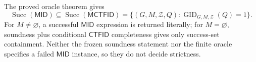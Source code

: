The proved oracle theorem gives
\[
 \operatorname{Succ}(\mathsf{MID})\subseteq\operatorname{Succ}(\mathsf{MCTFID})
 =\{(G,M,\mathcal Z,Q):\operatorname{GID}_{G,M,\mathcal Z}(Q)=1\}.
\]
For \(M\ne\varnothing\), a successful \(\mathsf{MID}\) expression is returned literally; for \(M=\varnothing\), soundness plus conditional \(\mathsf{CTFID}\) completeness gives only success-set containment.  Neither the frozen soundness statement nor the finite oracle specifies a failed \(\mathsf{MID}\) instance, so they do not decide strictness.